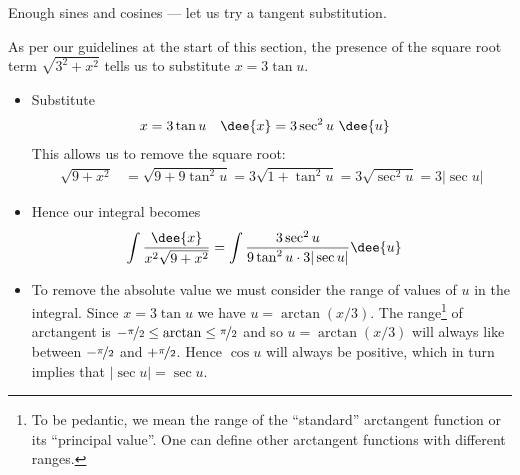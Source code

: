 Enough sines and cosines --- let us try a tangent substitution.
\begin{eg}\label{eg:INVTRIGb}
\soln As per our guidelines at the start of this section, the presence of the square root
term $\sqrt{3^2+x^2}$ tells us to substitute $x=3\tan u$.
\begin{itemize}
 \item Substitute
\begin{align*}
x&=3\tan u &
\dee{x} &= 3\sec^2 u\ \dee{u}
\end{align*}
This allows us to remove the square root:
\begin{align*}
\sqrt{9+x^2}
&=\sqrt{9+9\tan^2u}
=3\sqrt{1+\tan^2u}
=3\sqrt{\sec^2 u}
=3|\sec u|
\end{align*}
\item Hence our integral becomes
\begin{align*}
 \int \frac{\dee{x}}{x^2\sqrt{9+x^2}}
  &= \int \frac{3\sec^2 u}{9\tan^2u \cdot 3|\sec u|} \dee{u}
\end{align*}

\item To remove the absolute value we must consider the range of values of $u$ in
the integral. Since $x=3\tan u$ we have $u = \arctan(x/3)$. The range\footnote{To be
pedantic, we mean the range of the ``standard'' arctangent function or its ``principal
value''. One can define other arctangent functions with different ranges.} of arctangent
is $-\nicefrac{\pi}{2} \leq \arctan  \leq \nicefrac{\pi}{2}$ and so $u=\arctan(x/3)$
will always like between $-\nicefrac{\pi}{2}$ and $+\nicefrac{\pi}{2}$. Hence $\cos u$
will always be positive, which in turn implies that $|\sec u|=\sec u$.


\end{itemize}
\end{eg}
